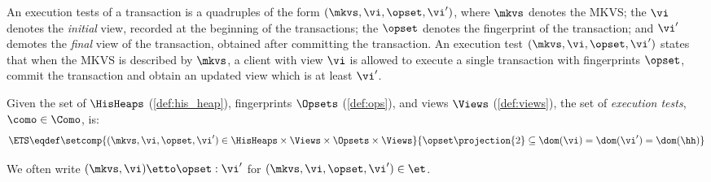 An execution tests of a transaction is a quadruples of the form \( (\mkvs, \vi, \opset, \vi') \), where $\mkvs$ denotes the MKVS;
the $\vi$ denotes the \emph{initial} view, recorded at the beginning of the transactions; 
the $\opset$ denotes the fingerprint of the transaction; and 
$\vi'$ demotes the \emph{final} view of the transaction, obtained after committing the transaction. 
An execution test $(\mkvs, \vi, \opset, \vi')$ states that when the MKVS is described by $\mkvs$, a client with view $\vi$ is allowed to execute a single transaction with fingerprints $\opset$, commit the transaction and obtain an updated view which is at least $\vi'$. 
%
%
%
%
\begin{definition}
\label{def:consistency-models}
\label{def:executiontests}
Given the set of $\HisHeaps$ (\cref{def:his_heap}), fingerprints $\Opsets$ (\cref{def:ops}), and views $\Views$ (\cref{def:views}), the set of \emph{execution tests}, \( \como \in \Como \), is:
\[
        \ETS \eqdef  
		\setcomp{
			(\mkvs, \vi, \opset, \vi') \in \HisHeaps \times \Views \times \Opsets \times \Views
		} 
		{
		\opset\projection{2} \subseteq \dom(\vi) = \dom(\vi') = \dom(\hh)
		}       
\]
\end{definition}
%
We often write $(\mkvs, \vi) \etto \opset : \vi'$ for  $(\mkvs, \vi, \opset, \vi') \in \et$.


